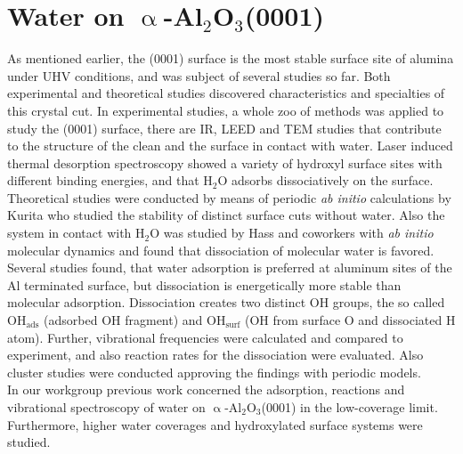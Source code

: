 \documentclass[11pt,DIV=13,BCOR=5mm,a4paper,headinclude]{scrbook}
\begin{document}
\chapter{Water on $\upalpha$-Al$_2$O$_3$(0001)}\label{sec:0001}
As mentioned earlier, the (0001) surface is the most stable surface site of alumina under UHV conditions, and was subject of several studies so far\cite{kuri10,hass98,hass00,Elam1998,Brown1999,Kelber2007,Tsyganenko1996,Chang1971,Lee1985,Nelson1998,Ranea2009,Thissen2009,Shapovalov2000,Wittbrodt1998,Wang2011}.
Both experimental and theoretical studies discovered characteristics and specialties of this crystal cut.
In experimental studies, a whole zoo of methods was applied to study the (0001) surface, there are IR\cite{Tsyganenko1996}, LEED\cite{Chang1971} and TEM\cite{Lee1985} studies that contribute to the structure of the clean and the surface in contact with water.
Laser induced thermal desorption spectroscopy\cite{Elam1998,Nelson1998} showed a variety of hydroxyl surface sites with different binding energies, and that H$_2$O adsorbs dissociatively on the surface.
Theoretical studies were conducted by means of periodic \textit{ab initio} calculations by Kurita\cite{kuri10} who studied the stability of distinct surface cuts without water. Also the system in contact with H$_2$O was studied by Hass and coworkers\cite{hass98,hass00} with \textit{ab initio} molecular dynamics and found that dissociation of molecular water is favored.
Several studies found, that water adsorption is preferred at aluminum sites of the Al terminated surface\cite{hass00,Ranea2009}, but dissociation is energetically more stable than molecular adsorption.
Dissociation creates two distinct OH groups, the so called OH$_\textrm{ads}$ (adsorbed OH fragment) and OH$_\textrm{surf}$ (OH from surface O and dissociated H atom)\cite{Thissen2009,Ranea2009}.
Further, vibrational frequencies were calculated and compared to experiment\cite{Wirth2014,Wang2011}, and also reaction rates for the dissociation were evaluated\cite{WirthJPCC2012,Wang2011}.
Also cluster studies were conducted approving the findings with periodic models\cite{Wittbrodt1998,Shapovalov2000}.
\\

In our workgroup previous work concerned the adsorption, reactions and vibrational spectroscopy of water on $\upalpha$-Al$_2$O$_3$(0001) in the low-coverage limit.
Furthermore, higher water coverages and hydroxylated surface systems were studied\cite{WirthJPCC2012,Wirth2014,Wirth2015,Melani2018}.
\\\\
\end{document}

